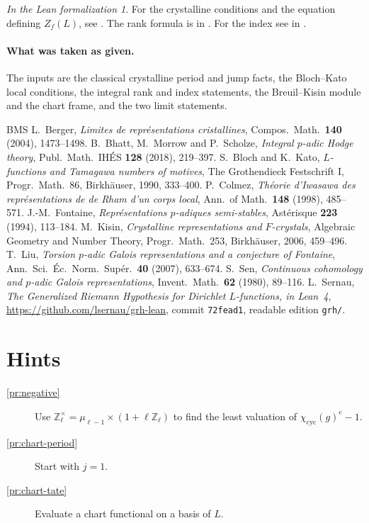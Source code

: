 \documentclass[reqno]{amsart}
\theoremstyle{definition}
\theoremstyle{plain}
\theoremstyle{remark}
\newtheorem*{leanremark}{In the Lean formalization}
\newcommand{\Z}{\mathbb Z}
\begin{document}
\begin{leanremark}
For the crystalline conditions and the equation defining \(Z_f(L)\),
see \cite{GL}. The rank formula is
 in .
For the index see  in
.
\end{leanremark}

\paragraph{What was taken as given.}
The inputs are the classical crystalline period and jump facts, the
Bloch--Kato local conditions, the integral rank and index statements,
the Breuil--Kisin module and the chart frame, and the two limit statements.

{\small
\begin{thebibliography}{BMS}
 L.~Berger, \emph{Limites de repr\'esentations cristallines}, Compos.\ Math.\ \textbf{140} (2004), 1473--1498.
 B.~Bhatt, M.~Morrow and P.~Scholze, \emph{Integral \(p\)-adic Hodge theory}, Publ.\ Math.\ IH\'ES \textbf{128} (2018), 219--397.
 S.~Bloch and K.~Kato, \emph{\(L\)-functions and Tamagawa numbers of motives}, The Grothendieck Festschrift I, Progr.\ Math.\ 86, Birkh\"auser, 1990, 333--400.
 P.~Colmez, \emph{Th\'eorie d'Iwasawa des repr\'esentations de de Rham d'un corps local}, Ann.\ of Math.\ \textbf{148} (1998), 485--571.
 J.-M.~Fontaine, \emph{Repr\'esentations \(p\)-adiques semi-stables}, Ast\'erisque \textbf{223} (1994), 113--184.
 M.~Kisin, \emph{Crystalline representations and \(F\)-crystals}, Algebraic Geometry and Number Theory, Progr.\ Math.\ 253, Birkh\"auser, 2006, 459--496.
 T.~Liu, \emph{Torsion \(p\)-adic Galois representations and a conjecture of Fontaine}, Ann.\ Sci.\ \'Ec.\ Norm.\ Sup\'er.\ \textbf{40} (2007), 633--674.
 S.~Sen, \emph{Continuous cohomology and \(p\)-adic Galois representations}, Invent.\ Math.\ \textbf{62} (1980), 89--116.
 L.~Sernau, \emph{The Generalized Riemann Hypothesis for Dirichlet \(L\)-functions, in Lean~4}, \url{https://github.com/lsernau/grh-lean}, commit \texttt{72fead1}, readable edition \texttt{grh/}.
\end{thebibliography}
}

\section*{Hints}

\begin{description}
\item[\ref{pr:negative}] Use \(\Z_\ell^\times=\mu_{\ell-1}\times(1+\ell\Z_\ell)\) to find the least valuation of
\(\chi_{\mathrm{cyc}}(g)^e-1\).
\item[\ref{pr:chart-period}] Start with \(j=1\).
\item[\ref{pr:chart-tate}] Evaluate a chart functional on a basis of \(L\).
\end{description}
\end{document}
